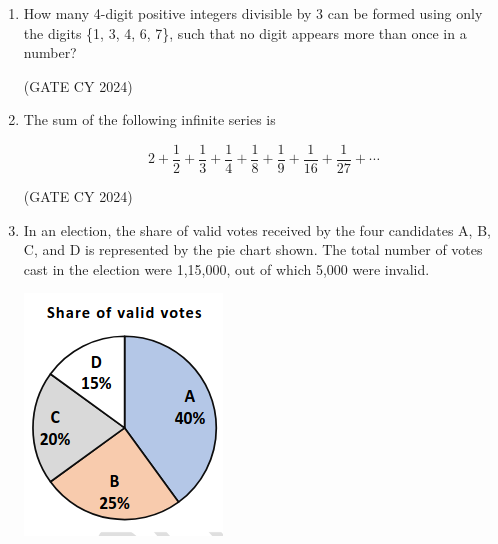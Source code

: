 \documentclass[12pt]{article}
\begin{document}
\begin{enumerate}
\item How many 4-digit positive integers divisible by 3 can be formed using only the digits \{1, 3, 4, 6, 7\}, such that no digit appears more than once in a number?

\begin{enumerate}
\end{enumerate}
\hfill (GATE CY 2024)

\item The sum of the following infinite series is

\[
2 + \frac{1}{2} + \frac{1}{3} + \frac{1}{4} + \frac{1}{8} + \frac{1}{9} + \frac{1}{16} + \frac{1}{27} + \cdots
\]

\begin{enumerate}
\end{enumerate}
\hfill (GATE CY 2024)

\item In an election, the share of valid votes received by the four candidates A, B, C, and D is represented by the pie chart shown. The total number of votes cast in the election were 1,15,000, out of which 5,000 were invalid.

\begin{center}
\includegraphics[width=0.45\columnwidth]{figs/q5.png}
\label{fig:q5}
\end{center}


\end{enumerate}
\end{document}
